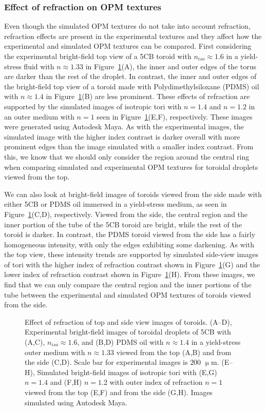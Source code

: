 \subsubsection{Effect of refraction on OPM textures}
Even though the simulated OPM textures do not take into account refraction, refraction effects are present in the experimental textures and they affect how the experimental and simulated OPM textures can be compared.
First considering the experimental bright-field top view of a 5CB toroid with $n_{iso} \approx 1.6 $ in a yield-stress fluid with $n \approx 1.33$ in Figure~\ref{f:4-refraction}(A), the inner and outer edges of the torus are darker than the rest of the droplet.
In contrast, the inner and outer edges of the bright-field top view of a toroid made with Polydimethylsiloxane (PDMS) oil with $n \approx 1.4$ in Figure~\ref{f:4-refraction}(B) are less prominent.
These effects of refraction are supported by the simulated images of isotropic tori with $n = 1.4$ and $n = 1.2$ in an outer medium with $n=1$ seen in Figure~\ref{f:4-refraction}(E,F), respectively.
These images were generated using Autodesk Maya.
As with the experimental images, the simulated image with the higher index contrast is darker overall with more prominent edges than the image simulated with a smaller index contrast.
From this, we know that we should only consider the region around the central ring when comparing simulated and experimental OPM textures for toroidal droplets viewed from the top.

We can also look at bright-field images of toroids viewed from the side made with either 5CB or PDMS oil immersed in a yield-stress medium, as seen in Figure~\ref{f:4-refraction}(C,D), respectively.
Viewed from the side, the central region and the inner portion of the tube of the 5CB toroid are bright, while the rest of the toroid is darker.
In contrast, the PDMS toroid viewed from the side has a fairly homogeneous intensity, with only the edges exhibiting some darkening.
As with the top view, these intensity trends are supported by simulated side-view images of tori with the higher index of refraction contrast shown in Figure~\ref{f:4-refraction}(G) and the lower index of refraction contrast shown in Figure~\ref{f:4-refraction}(H).
From these images, we find that we can only compare the central region and the inner portions of the tube between the experimental and simulated OPM textures of toroids viewed from the side.
\begin{figure}
\centering
\caption{Effect of refraction of top and side view images of toroids.
(A--D), Experimental bright-field images of toroidal droplets of 5CB with (A,C), $n_{iso} \approx 1.6$, and (B,D) PDMS oil with $n \approx 1.4$ in a yield-stress outer medium with $n \approx 1.33$ viewed from the top (A,B) and from the side (C,D).
Scale bar for experimental images is $200$ $\upmu$m.
(E--H), Simulated bright-field images of isotropic tori with (E,G) $n =1.4$ and (F,H) $n=1.2$ with outer index of refraction $n = 1$ viewed from the top (E,F) and from the side (G,H).
Images simulated using Autodesk Maya.}\label{f:4-refraction}
\end{figure}

